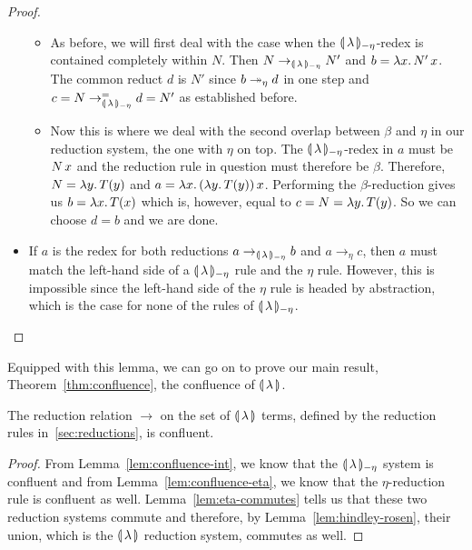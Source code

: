 \begin{proof}
\begin{itemize}
\begin{itemize}
    \item As before, we will first deal with the case when the
      ${\llparenthesis \, \lambda \, \rrparenthesis_{-\eta}}$-redex is contained completely within $N$. Then
      $N \to_{{\llparenthesis \, \lambda \, \rrparenthesis_{-\eta}}} N'$ and $b = \lambda x.\, N'\,x$. The common
      reduct $d$ is $N'$ since $b \twoheadrightarrow_\eta d$ in one step and
      $c = N \to_{{\llparenthesis \, \lambda \, \rrparenthesis_{-\eta}}}^= d = N'$ as established before.
    \item Now this is where we deal with the second overlap between $\beta$
      and $\eta$ in our reduction system, the one with $\eta$ on top. The
      ${\llparenthesis \, \lambda \, \rrparenthesis_{-\eta}}$-redex in $a$ must be $N\,x$ and the reduction rule in
      question must therefore be $\beta$. Therefore, $N = \lambda y.\, T(y)$
      and $a = \lambda x.\, (\lambda y.\, T(y))\,x$. Performing the
      $\beta$-reduction gives us $b = \lambda x.\, T(x)$ which is, however,
      equal to $c = N = \lambda y.\, T(y)$. So we can choose $d = b$ and we are
      done.
    \end{itemize}
  \item If $a$ is the redex for both reductions $a \to_{{\llparenthesis \, \lambda \, \rrparenthesis_{-\eta}}} b$ and
    $a \to_\eta c$, then $a$ must match the left-hand side of a ${\llparenthesis \, \lambda \, \rrparenthesis_{-\eta}}$
    rule and the $\eta$ rule. However, this is impossible since the
    left-hand side of the $\eta$ rule is headed by abstraction, which is
    the case for none of the rules of ${\llparenthesis \, \lambda \, \rrparenthesis_{-\eta}}$.
  \end{itemize}
\end{proof}

Equipped with this lemma, we can go on to prove our main result,
Theorem~\ref{thm:confluence}, the confluence of $\llparenthesis \, \lambda \, \rrparenthesis$.

\begin{theorem}\label{thm:confluence}
  
  The reduction relation $\to$ on the set of $\llparenthesis \, \lambda \, \rrparenthesis$ terms,
  defined by the reduction rules in~\ref{sec:reductions}, is confluent.
\end{theorem}

\begin{proof}
  From Lemma~\ref{lem:confluence-int}, we know that the
  $\llparenthesis \, \lambda \, \rrparenthesis_{-\eta}$ system is confluent and from
  Lemma~\ref{lem:confluence-eta}, we know that the $\eta$-reduction rule is
  confluent as well. Lemma~\ref{lem:eta-commutes} tells us that these two
  reduction systems commute and therefore, by
  Lemma~\ref{lem:hindley-rosen}, their union, which is the
  $\llparenthesis \, \lambda \, \rrparenthesis$ reduction system, commutes as well.
\end{proof}



